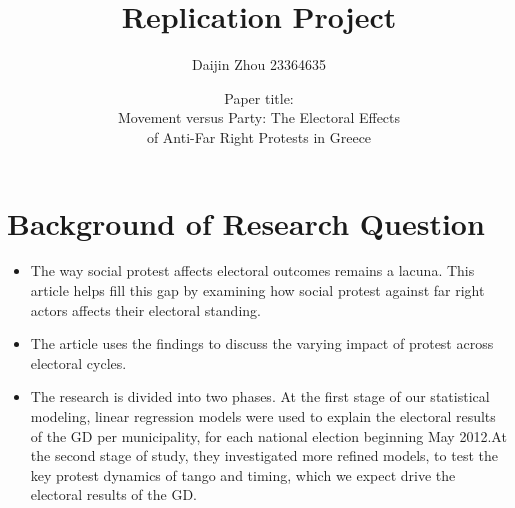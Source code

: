 \documentclass[12pt,letterpaper]{article}
\title{Replication Project}
\date{Paper title: \\
	Movement versus Party: The Electoral Effects \\
	of Anti-Far Right Protests in Greece}
\author{Daijin Zhou 23364635}
\begin{document}
	\maketitle
	\section*{Background of Research Question}
	\begin{itemize}
\item The way social protest affects electoral outcomes remains a lacuna. This article helps fill this gap by examining how social protest against far right actors affects their electoral standing.
\item The article uses the findings to discuss the varying impact of protest across electoral cycles.
\item The research is divided into two phases. At the first stage of our statistical modeling, linear regression models were used to explain the electoral results of the GD per municipality, for each national election beginning May 2012.At the second stage of study, they investigated more refined models, to test the key protest dynamics of tango and timing, which we expect drive the electoral results of the GD.
	\end{itemize}

	\vspace{.25cm}
\end{document}
